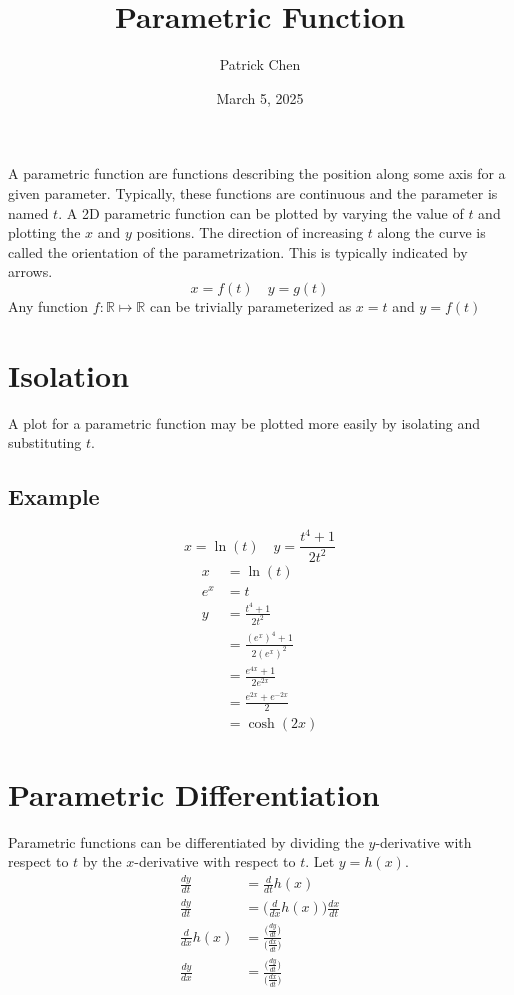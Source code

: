 \documentclass{article}
\title{Parametric Function}
\author{Patrick Chen}
\date{March 5, 2025}
\theoremstyle{mytheoremstyle}
\theoremstyle{mytheoremstyle}
\theoremstyle{myproblemstyle}
\begin{document}
    \maketitle
    A parametric function are functions describing the position along some axis
    for a given parameter. Typically, these functions are continuous and the
    parameter is named $t$. A 2D parametric function can be plotted by varying
    the value of $t$ and plotting the $x$ and $y$ positions. The direction of
    increasing $t$ along the curve is called the orientation of the
    parametrization. This is typically indicated by arrows.
    \[
        x = f(t) \quad y = g(t)
    \]
    Any function $f: \mathbb{R} \mapsto \mathbb{R}$ can be trivially
    parameterized as $x=t$ and $y=f(t)$

    \section*{Isolation}
    A plot for a parametric function may be plotted more easily by isolating and
    substituting $t$.
    \subsection*{Example}
    \[
        x = \ln(t) \quad y=\frac{t^4+1}{2t^2}
    \]
    \begin{align*}
        x   &= \ln(t) \\
        e^x &= t \\
        y   &=\frac{t^4+1}{2t^2} \\
        &=\frac{(e^x)^4+1}{2(e^x)^2} \\
        &=\frac{e^{4x}+1}{2e^{2x}} \\
        &=\frac{e^{2x} + e^{-2x}}{2} \\
        &=\cosh(2x)
    \end{align*}

    \section*{Parametric Differentiation}
    Parametric functions can be differentiated by dividing the $y$-derivative with
    respect to $t$ by the $x$-derivative with respect to $t$. Let $y = h(x)$.
    \begin{align*}
        \frac{dy}{dt} &= \frac{d}{dt} h(x)  \\
        \frac{dy}{dt} &= \Big(\frac{d}{dx} h(x)\Big) \frac{dx}{dt} \\
        \frac{d}{dx} h(x) &= \frac{\Big(\frac{dy}{dt}\Big)}{\Big(\frac{dx}{dt}\Big)} \\
        \frac{dy}{dx} &= \frac{\Big(\frac{dy}{dt}\Big)}{\Big(\frac{dx}{dt}\Big)}
    \end{align*}
\end{document}
